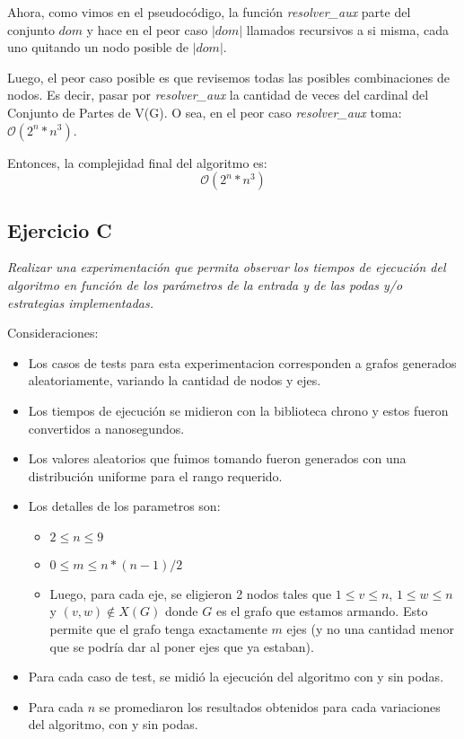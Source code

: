 Ahora, como vimos en el pseudocódigo, la función \textit{resolver_aux} parte del conjunto $dom$ y hace en el peor caso $|dom|$ llamados recursivos a si misma, cada uno quitando un nodo posible de $|dom|$.

Luego, el peor caso posible es que revisemos todas las posibles combinaciones de nodos. Es decir, pasar por \textit{resolver_aux} la cantidad de veces del cardinal del Conjunto de Partes de V(G). O sea, en el peor caso \textit{resolver_aux} toma: $\mathcal{O}(2^n*n^3)$.

Entonces, la complejidad final del algoritmo es:
$$\mathcal{O}(2^n*n^3)$$


\subsection{Ejercicio C}

\textit{Realizar una experimentación que permita observar los tiempos de ejecución del algoritmo en función de los parámetros de la entrada y de las podas y/o estrategias implementadas.}
\medskip

Consideraciones:
\begin{itemize}
    \item Los casos de tests para esta experimentacion corresponden a grafos generados aleatoriamente, variando la cantidad de nodos y ejes.
    \item Los tiempos de ejecución se midieron con la biblioteca chrono y estos fueron convertidos a nanosegundos.
    \item Los valores aleatorios que fuimos tomando fueron generados con una distribución uniforme para el rango requerido.
    \item Los detalles de los parametros son:
        \begin{itemize}
            \item $2 \leq n \leq 9$
            \item $0 \leq m \leq n*(n-1)/2$
            \item Luego, para cada eje, se eligieron 2 nodos tales que $1 \leq v \leq n$, $1 \leq w \leq n$ y $(v,w) \notin X(G)$ donde $G$ es el grafo que estamos armando. Esto permite que el grafo tenga exactamente $m$ ejes (y no una cantidad menor que se podría dar al poner ejes que ya estaban).
        \end{itemize}
    \item Para cada caso de test, se midió la ejecución del algoritmo con y sin podas.
    \item Para cada $n$ se promediaron los resultados obtenidos para cada variaciones del algoritmo, con y sin podas.
\end{itemize}

